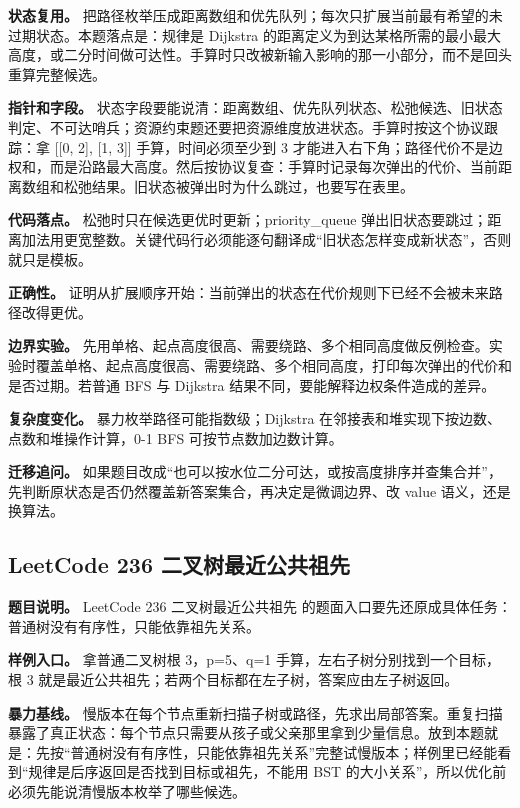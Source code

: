 \textbf{状态复用。} 把路径枚举压成距离数组和优先队列；每次只扩展当前最有希望的未过期状态。本题落点是：规律是 Dijkstra 的距离定义为到达某格所需的最小最大高度，或二分时间做可达性。手算时只改被新输入影响的那一小部分，而不是回头重算完整候选。

\textbf{指针和字段。} 状态字段要能说清：距离数组、优先队列状态、松弛候选、旧状态判定、不可达哨兵；资源约束题还要把资源维度放进状态。手算时按这个协议跟踪：拿 [[0, 2], [1, 3]] 手算，时间必须至少到 3 才能进入右下角；路径代价不是边权和，而是沿路最大高度。然后按协议复查：手算时记录每次弹出的代价、当前距离数组和松弛结果。旧状态被弹出时为什么跳过，也要写在表里。

\textbf{代码落点。} 松弛时只在候选更优时更新；priority\_queue 弹出旧状态要跳过；距离加法用更宽整数。关键代码行必须能逐句翻译成“旧状态怎样变成新状态”，否则就只是模板。

\textbf{正确性。} 证明从扩展顺序开始：当前弹出的状态在代价规则下已经不会被未来路径改得更优。

\textbf{边界实验。} 先用单格、起点高度很高、需要绕路、多个相同高度做反例检查。实验时覆盖单格、起点高度很高、需要绕路、多个相同高度，打印每次弹出的代价和是否过期。若普通 BFS 与 Dijkstra 结果不同，要能解释边权条件造成的差异。

\textbf{复杂度变化。} 暴力枚举路径可能指数级；Dijkstra 在邻接表和堆实现下按边数、点数和堆操作计算，0-1 BFS 可按节点数加边数计算。

\textbf{迁移追问。} 如果题目改成“也可以按水位二分可达，或按高度排序并查集合并”，先判断原状态是否仍然覆盖新答案集合，再决定是微调边界、改 value 语义，还是换算法。

\subsection{LeetCode 236 二叉树最近公共祖先}

\textbf{题目说明。} LeetCode 236 二叉树最近公共祖先 的题面入口要先还原成具体任务：普通树没有有序性，只能依靠祖先关系。

\textbf{样例入口。} 拿普通二叉树根 3，p=5、q=1 手算，左右子树分别找到一个目标，根 3 就是最近公共祖先；若两个目标都在左子树，答案应由左子树返回。

\textbf{暴力基线。} 慢版本在每个节点重新扫描子树或路径，先求出局部答案。重复扫描暴露了真正状态：每个节点只需要从孩子或父亲那里拿到少量信息。放到本题就是：先按“普通树没有有序性，只能依靠祖先关系”完整试慢版本；样例里已经能看到“规律是后序返回是否找到目标或祖先，不能用 BST 的大小关系”，所以优化前必须先能说清慢版本枚举了哪些候选。

